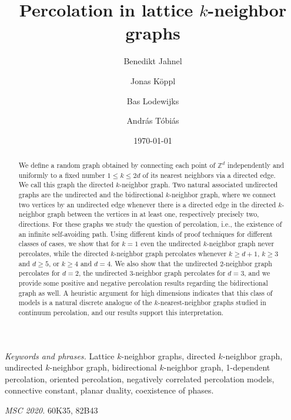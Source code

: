 \documentclass[a4paper, oneside, 11pt]{amsart}
\title{Percolation in lattice $k$-neighbor graphs}
\date{\today}
\author{Benedikt Jahnel}
\author{Jonas K\"oppl}
\author{Bas Lodewijks}
\author{Andr\'as T\'obi\'as}
\theoremstyle{definition}
\newcommand{\1}{\mathbbm{1}}
\newcommand{\0}{\mathbf{o}}
\newcommand{\Z}{\mathbb{Z}}
\numberwithin{equation}{section}
\begin{document}
\maketitle

\begin{abstract}
We define a random graph obtained by connecting each point of $\Z^d$ independently and uniformly to a fixed number $1 \leq k \leq 2d$ of its nearest neighbors via a directed edge. 
We call this graph the directed $k$-neighbor graph. Two natural associated undirected graphs are the undirected and the bidirectional $k$-neighbor graph, where we connect two vertices by an undirected edge whenever there is a directed edge in the directed $k$-neighbor graph between the vertices in at least one, respectively precisely two, directions. 
For these graphs we study the question of percolation, i.e., the existence of an infinite self-avoiding path. 
Using different kinds of proof techniques for different classes of cases, we show that for $k=1$ even the undirected $k$-neighbor graph never percolates, while the directed $k$-neighbor graph percolates whenever $k \geq d+1$, $k \geq 3$ and $d \geq 5$, or $k \geq 4$ and $d=4$.
We also show that the undirected $2$-neighbor graph percolates for $d=2$, the undirected $3$-neighbor graph percolates for $d=3$, and we provide some positive and negative percolation results regarding the bidirectional graph as well.
A heuristic argument for high dimensions indicates that this class of models is a natural discrete analogue of the $k$-nearest-neighbor graphs studied in continuum percolation, and our results support this interpretation.
\end{abstract}

\emph{Keywords and phrases.} Lattice $k$-neighbor graphs, directed $k$-neighbor graph, undirected $k$-neighbor graph, bidirectional $k$-neighbor graph, 1-dependent percolation, oriented percolation, negatively correlated percolation models, connective constant, planar duality, coexistence of phases.

\smallskip

\emph{MSC 2020.} 60K35, 82B43
\end{document}
